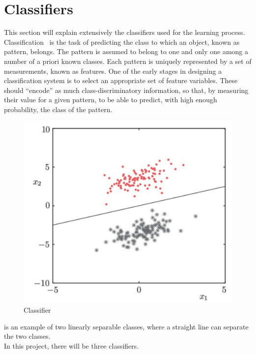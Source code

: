 \section{Classifiers}
This section will explain extensively the classifiers used for the learning process.\\
Classification~\cite{classif} is the task of predicting the class to which an object, known as pattern, belongs. The pattern is assumed to belong to one and only one among a number of a priori known classes. Each pattern is uniquely represented by a set of measurements, known as features. One of the early stages in designing a classification system is to select an appropriate set of feature variables. These should “encode” as much class-discriminatory information, so that, by measuring their value for a given pattern, to be able to predict, with high enough probability, the class of the pattern. 
\begin{figure}
	\includegraphics[width=\linewidth]{img/classifier.png}
	\caption{Classifier~\cite{classif}}
	\label{fig:classifier}
\end{figure}
 is an example of two linearly separable classes, where a straight line can separate the two classes. \\
In this project, there will be three classifiers.
